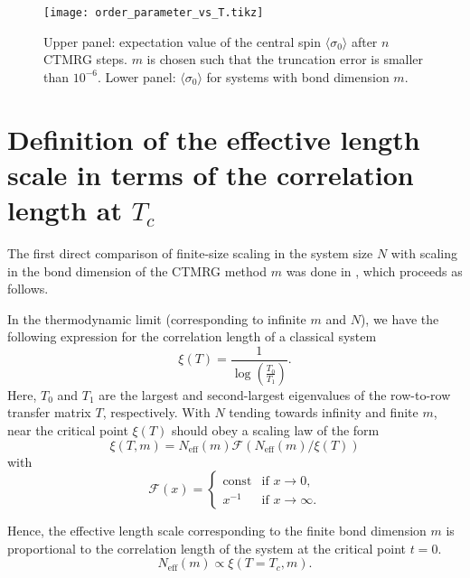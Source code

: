 \begin{figure}
\texttt{[image: order\_parameter\_vs\_T.tikz]}
\caption{Upper panel: expectation value of the central spin $\langle \sigma_0 \rangle$
  after $n$ CTMRG steps. $m$ is chosen such that the truncation error is smaller than
  $10^{-6}$. Lower panel: $\langle \sigma_0 \rangle$ for systems with bond dimension $m$.}\label{fig:order_parameter_vs_T}
\end{figure}

\section{Definition of the effective length scale in terms of the correlation length at $T_c$}\label{sec:definition_effective_length_scale_in_terms_of_xi}

The first direct comparison of finite-size scaling in the system size $N$ with scaling in
the bond dimension of the CTMRG method $m$ was done
in \cite{nishino1996numerical}, which proceeds as follows.

In the thermodynamic limit (corresponding to infinite $m$ and $N$), we have the following
expression for the correlation length of a classical system
\cite{baxter1982exactly_correlation_length}
\begin{equation}\label{eq:correlation_length_row_to_row_transfer_matrix}
  \xi(T) = \frac{1}{\log\left(\frac{T_0}{T_1}\right)}.
\end{equation}
Here, $T_0$ and $T_1$ are the largest and second-largest eigenvalues of the row-to-row
transfer matrix $T$, respectively. With $N$ tending towards infinity and finite $m$, near
the critical point $\xi(T)$ should obey a scaling law of the form
\begin{equation}
  \xi(T, m) = N_{\text{eff}}(m) \mathcal{F}(N_{\text{eff}}(m) / \xi(T))
\end{equation}
with
\begin{equation}
  \mathcal{F}(x) = \begin{cases}
      \text{const} & \text{if } x \to 0, \\
      x^{-1} & \text{if } x \to \infty.
    \end{cases}
\end{equation}

Hence, the effective length scale corresponding to the finite bond dimension $m$ is
proportional to the correlation length of the system at the critical point $t = 0$.
\begin{equation}
  N_{\text{eff}}(m) \propto \xi(T = T_c, m).
\end{equation}

